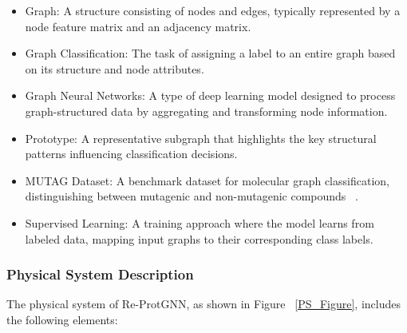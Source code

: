 \documentclass[12pt]{article}
\begin{document}
\begin{itemize}

\item Graph: A structure consisting of nodes and edges, typically represented by a node feature matrix and an adjacency matrix.
\item Graph Classification: The task of assigning a label to an entire graph based on its structure and node attributes.
\item Graph Neural Networks: A type of deep learning model designed to process graph-structured data by aggregating and transforming node information.
\item Prototype: A representative subgraph that highlights the key structural patterns influencing classification decisions.
\item MUTAG Dataset: A benchmark dataset for molecular graph classification, distinguishing between mutagenic and non-mutagenic compounds ~\citep{debnath1991structure}.
\item Supervised Learning: A training approach where the model learns from labeled data, mapping input graphs to their corresponding class labels.

\end{itemize}

\subsubsection{Physical System Description} \label{sec_phySystDescrip}

The physical system of Re-ProtGNN, as shown in Figure ~\ref{PS_Figure},
includes the following elements:
\end{document}
